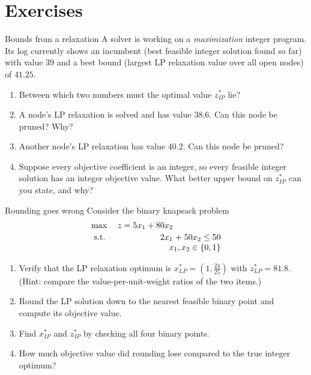 \section{Exercises}


\begin{ex}{Bounds from a relaxation}{}
\label{ex:ch13-lp-bounds}
A solver is working on a \emph{maximization} integer program.  Its log currently
shows an incumbent (best feasible integer solution found so far) with value
$39$ and a best bound (largest LP relaxation value over all open nodes) of
$41.25$.
\begin{enumerate}
\item Between which two numbers must the optimal value $z^*_{IP}$ lie?
\item A node's LP relaxation is solved and has value $38.6$.  Can this node be
pruned?  Why?
\item Another node's LP relaxation has value $40.2$.  Can this node be pruned?
\item Suppose every objective coefficient is an integer, so every feasible
integer solution has an integer objective value.  What better upper bound on
$z^*_{IP}$ can you state, and why?
\end{enumerate}
\exrefs{\S\ref{sec:lp-relaxation-ip}; \S\ref{sec:solver-output}}
\end{ex}

\begin{ex}{Rounding goes wrong}{}
\label{ex:ch13-rounding}
Consider the binary knapsack problem
\[
\begin{array}{l r@{\;}c@{\;}r@{\;}c@{\;}r}
\max & z = 5x_1 + 80x_2 & & & & \\[2pt]
\st  & 2x_1 & + & 50x_2 & \leq & 50 \\
     & \multicolumn{5}{r}{x_1, x_2 \in \{0,1\}}
\end{array}
\]
\begin{enumerate}
\item Verify that the LP relaxation optimum is $x^*_{LP} = (1, \tfrac{24}{25})$
with $z^*_{LP} = 81.8$.  (Hint: compare the value-per-unit-weight ratios of
the two items.)
\item Round the LP solution down to the nearest feasible binary point and
compute its objective value.
\item Find $x^*_{IP}$ and $z^*_{IP}$ by checking all four binary points.
\item How much objective value did rounding lose compared to the true integer
optimum?
\end{enumerate}
\exrefs{\S\ref{subsec:rounding-bad}; \S\ref{subsec:rounding-infeasible}}
\end{ex}

